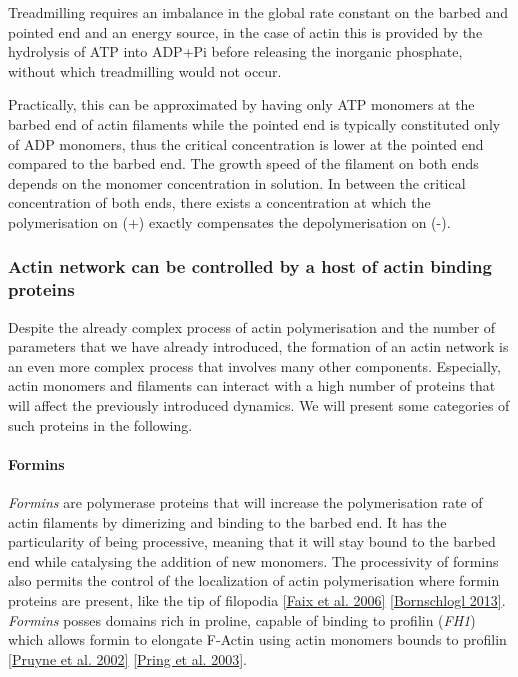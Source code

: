 \documentclass[A4paperpaper,11pt,english]{sphinxmanual}
\begin{document}
Treadmilling requires an imbalance in the global rate constant on the barbed and
pointed end and an energy source, in the case of actin this is provided by the
hydrolysis of ATP into ADP+Pi before releasing the inorganic phosphate, without
which treadmilling would not occur.

Practically, this can be approximated by having only ATP monomers at the barbed
end of actin filaments while the pointed end is typically constituted only of
ADP monomers, thus the critical concentration is lower at the  pointed end
compared to the barbed end. The growth speed of the filament on both
ends depends on the monomer concentration in solution. In between the
critical concentration of both ends, there exists a concentration at which the
polymerisation on (+) exactly compensates the depolymerisation on (-).


\subsubsection{Actin network can be controlled by a host of actin binding proteins}
\label{index-latex:actin-network-can-be-controlled-by-a-host-of-actin-binding-proteins}
Despite the already complex process of actin polymerisation and the
number of parameters that we have already introduced, the formation of an actin
network is an even more complex process that involves many other components.
Especially, actin monomers and filaments can interact with a high number of
proteins that will affect the previously introduced dynamics.  We will present
some categories of such proteins in the following.


\paragraph{Formins}
\label{index-latex:formins}
\emph{Formins} are polymerase proteins that will increase the polymerisation rate
of actin filaments by dimerizing and binding to the barbed end. It has the
particularity of being processive, meaning that it will stay bound to the
barbed end while catalysing the addition of new monomers. The processivity of
formins also permits the control of the localization of actin polymerisation
where formin proteins are present, like the tip of filopodia {\hyperref[index-latex:faix2006]{{[}Faix et al. 2006{]}}}
{\hyperref[index-latex:bornschlogl2013]{{[}Bornschlogl  2013{]}}}. \emph{Formins} posses domains rich in proline, capable of
binding to profilin (\emph{FH1}) which allows formin to elongate F-Actin using actin
monomers bounds to profilin {\hyperref[index-latex:pruyne2002]{{[}Pruyne et al. 2002{]}}} {\hyperref[index-latex:pring2003a]{{[}Pring et al. 2003{]}}}.
\end{document}
